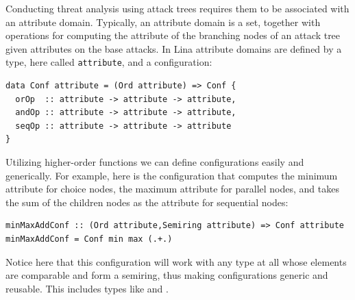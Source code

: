 \documentclass{llncs}
\begin{document}
Conducting threat analysis using attack trees requires them to be
associated with an attribute domain.  Typically, an attribute domain
is a set, together with operations for computing the attribute of the
branching nodes of an attack tree given attributes on the base
attacks.  In Lina attribute domains are defined by a type, here called
\verb!attribute!, and a configuration:
\begin{center}
  \begin{verbatim}
data Conf attribute = (Ord attribute) => Conf {
  orOp  :: attribute -> attribute -> attribute,    
  andOp :: attribute -> attribute -> attribute,
  seqOp :: attribute -> attribute -> attribute
}
\end{verbatim}
\end{center}
Utilizing higher-order functions we can define configurations easily
and generically.  For example, here is the configuration that computes
the minimum attribute for choice nodes, the maximum attribute for
parallel nodes, and takes the sum of the children nodes as the
attribute for sequential nodes:
\begin{center}
  \begin{verbatim}
minMaxAddConf :: (Ord attribute,Semiring attribute) => Conf attribute
minMaxAddConf = Conf min max (.+.)
\end{verbatim}
\end{center}
Notice here that this configuration will work with any type at all
whose elements are comparable and form a semiring, thus making
configurations generic and reusable.  This includes types like
 and .
\end{document}

